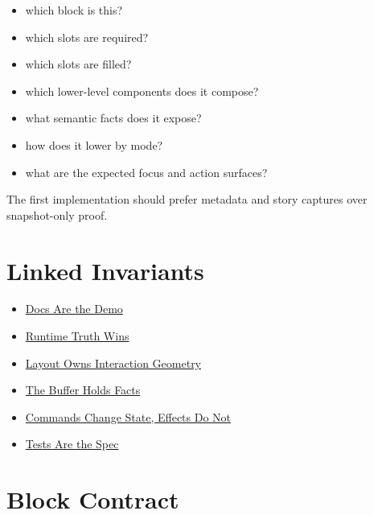 \begin{itemize}
\tightlist
\item
  which block is this?
\item
  which slots are required?
\item
  which slots are filled?
\item
  which lower-level components does it compose?
\item
  what semantic facts does it expose?
\item
  how does it lower by mode?
\item
  what are the expected focus and action surfaces?
\end{itemize}

The first implementation should prefer metadata and story captures over snapshot-only proof.

\section{Linked Invariants}\label{record-128-linked-invariants}

\begin{itemize}
\tightlist
\item
  \href{https://github.com/flyingrobots/bijou/blob/cbd70612140e7a450d764b3c7be1c6af878b99bc/docs/invariants/docs-are-the-demo.md}{Docs Are the Demo}
\item
  \href{https://github.com/flyingrobots/bijou/blob/cbd70612140e7a450d764b3c7be1c6af878b99bc/docs/invariants/runtime-truth-wins.md}{Runtime Truth Wins}
\item
  \href{https://github.com/flyingrobots/bijou/blob/cbd70612140e7a450d764b3c7be1c6af878b99bc/docs/invariants/layout-owns-interaction-geometry.md}{Layout Owns Interaction Geometry}
\item
  \href{https://github.com/flyingrobots/bijou/blob/cbd70612140e7a450d764b3c7be1c6af878b99bc/docs/invariants/buffer-holds-facts.md}{The Buffer Holds Facts}
\item
  \href{https://github.com/flyingrobots/bijou/blob/cbd70612140e7a450d764b3c7be1c6af878b99bc/docs/invariants/commands-change-state-effects-do-not.md}{Commands Change State, Effects Do Not}
\item
  \href{https://github.com/flyingrobots/bijou/blob/cbd70612140e7a450d764b3c7be1c6af878b99bc/docs/invariants/tests-are-the-spec.md}{Tests Are the Spec}
\end{itemize}

\section{Block Contract}\label{record-128-block-contract}

